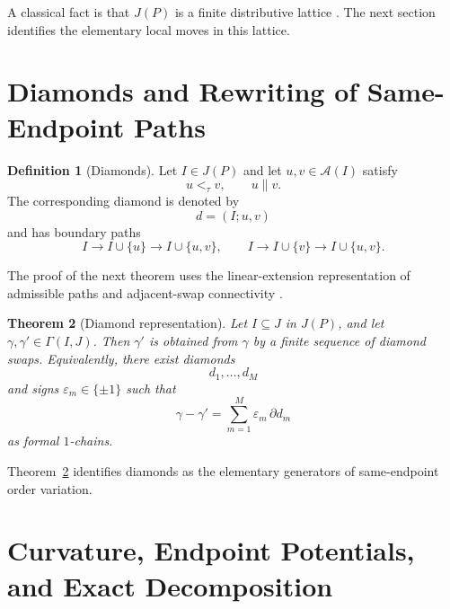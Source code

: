 \documentclass{article}
\newtheorem{theorem}{Theorem}[section]
\theoremstyle{definition}
\newtheorem{definition}[theorem]{Definition}
\begin{document}
A classical fact is that \(J(P)\) is a finite distributive lattice \cite{birkhoff1937,davey2002,stanley2011ec1}. The next section identifies the elementary local moves in this lattice.

\section{Diamonds and Rewriting of Same-Endpoint Paths}
\label{sec:diamonds}

\begin{definition}[Diamonds]
Let \(I\in J(P)\) and let \(u,v\in\mathcal A(I)\) satisfy
\[
u<_{\tau}v,\qquad u\parallel v.
\]
The corresponding {diamond} is denoted by
\[
d=(I;u,v)
\]
and has boundary paths
\[
I\to I\cup\{u\}\to I\cup\{u,v\},
\qquad
I\to I\cup\{v\}\to I\cup\{u,v\}.
\]
\end{definition}

The proof of the next theorem uses the linear-extension representation of admissible paths and adjacent-swap connectivity \cite{trotter1992,pruesse1994,stanley2011ec1}.

\begin{theorem}[Diamond representation]
\label{thm:diamond-representation-main}
Let \(I\subseteq J\) in \(J(P)\), and let \(\gamma,\gamma'\in \Gamma(I,J)\). Then \(\gamma'\) is obtained from \(\gamma\) by a finite sequence of diamond swaps. Equivalently, there exist diamonds
\[
d_1,\dots,d_M
\]
and signs \(\varepsilon_m\in\{\pm1\}\) such that
\begin{equation}
\textstyle \gamma-\gamma'=\sum_{m=1}^M \varepsilon_m\,\partial d_m
\label{eq:diamond-representation}
\end{equation}
as formal \(1\)-chains.
\end{theorem}

\begin{center}
\end{center}

Theorem~\ref{thm:diamond-representation-main} identifies diamonds as the elementary generators of same-endpoint order variation.

\section{Curvature, Endpoint Potentials, and Exact Decomposition}
\label{sec:curvature}
\end{document}
